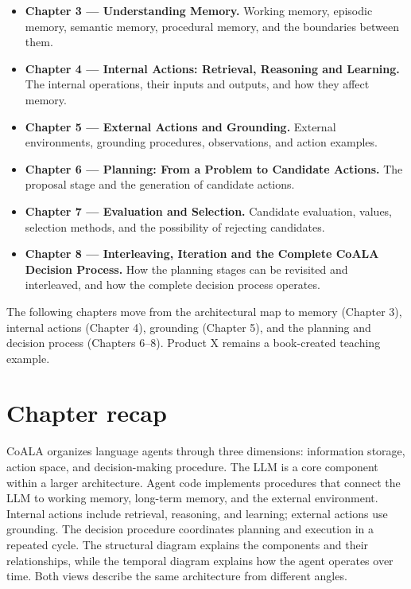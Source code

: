 \begin{itemize}
  \item \textbf{Chapter 3 --- Understanding Memory.} Working memory, episodic memory, semantic memory, procedural memory, and the boundaries between them.
  \item \textbf{Chapter 4 --- Internal Actions: Retrieval, Reasoning and Learning.} The internal operations, their inputs and outputs, and how they affect memory.
  \item \textbf{Chapter 5 --- External Actions and Grounding.} External environments, grounding procedures, observations, and action examples.
  \item \textbf{Chapter 6 --- Planning: From a Problem to Candidate Actions.} The proposal stage and the generation of candidate actions.
  \item \textbf{Chapter 7 --- Evaluation and Selection.} Candidate evaluation, values, selection methods, and the possibility of rejecting candidates.
  \item \textbf{Chapter 8 --- Interleaving, Iteration and the Complete CoALA Decision Process.} How the planning stages can be revisited and interleaved, and how the complete decision process operates.
\end{itemize}

The following chapters move from the architectural map to memory (Chapter 3), internal actions (Chapter 4), grounding (Chapter 5), and the planning and decision process (Chapters 6--8). Product X remains a book-created teaching example.

\section{Chapter recap}

\begin{chapterrecap}
CoALA organizes language agents through three dimensions: information storage, action space, and decision-making procedure. The LLM is a core component within a larger architecture. Agent code implements procedures that connect the LLM to working memory, long-term memory, and the external environment. Internal actions include retrieval, reasoning, and learning; external actions use grounding. The decision procedure coordinates planning and execution in a repeated cycle. The structural diagram explains the components and their relationships, while the temporal diagram explains how the agent operates over time. Both views describe the same architecture from different angles.
\end{chapterrecap}

